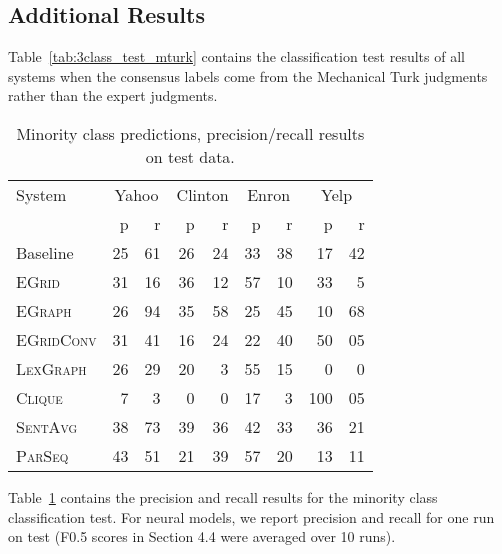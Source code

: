 \documentclass[11pt,a4paper]{article}
\newcommand \egrid{\textsc{EGrid}\xspace}
\newcommand \egraph{\textsc{EGraph}\xspace}
\newcommand \lexgraph{\textsc{LexGraph}\xspace}
\newcommand \parseq{\textsc{ParSeq}\xspace}
\newcommand \clique{\textsc{Clique}\xspace}
\newcommand \sentavg{\textsc{SentAvg}\xspace}
\newcommand \egridconv{\textsc{EGridConv}\xspace}
\begin{document}
\subsection{Additional Results}

Table~\ref{tab:3class_test_mturk} contains the classification test results of all systems when the consensus labels come from the Mechanical Turk judgments rather than the expert judgments. 

\begin{table}
\begin{center}
\begin{footnotesize}
\begin{tabular}{@{}lrrrrrrrr@{}}
	\toprule
System & \multicolumn{2}{c}{Yahoo} & \multicolumn{2}{c}{Clinton} & \multicolumn{2}{c}{Enron}  & \multicolumn{2}{c}{Yelp} \\	
    & p & r & p & r & p & r & p & r \\
    \midrule
    Baseline & 25 & 61 & 26 & 24 & 33 & 38 & 17 & 42  \\ 
    \midrule
    \egrid & 31 & 16 & 36 & 12 & 57 & 10 & 33 & 5 \\
    \egraph & 26 & 94 & 35 & 58 & 25 & 45 & 10 & 68  \\
	\egridconv & 31 & 41 & 16 & 24 & 22 & 40 & 50 & 05 \\ 
    \midrule
    \lexgraph & 26 & 29 & 20 & 3 & 55 & 15 & 0 & 0  \\ 
    \midrule
    \clique & 7 & 3 & 0 & 0 & 17 & 3 & 100 & 05 \\
    \sentavg & 38 & 73 & 39 & 36 & 42 & 33 & 36 & 21 \\	
    \parseq & 43 & 51 & 21 & 39 & 57 & 20 & 13 & 11  \\	
	\bottomrule
\end{tabular}
\end{footnotesize}
\caption{Minority class predictions, precision/recall results on test data.}
\label{tab:minority_test}
\end{center}
\end{table}

Table~\ref{tab:minority_test} contains the precision and recall results for the minority class classification test. For neural models, we report precision and recall for one run on test (F0.5 scores in Section 4.4 were averaged over 10 runs).
\end{document}
